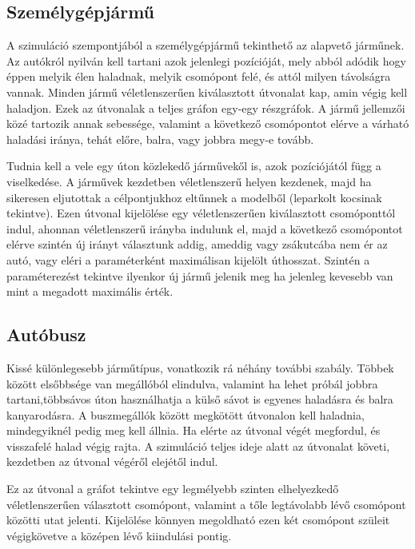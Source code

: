 \subsection{Személygépjármű}

A szimuláció szempontjából a személygépjármű tekinthető az alapvető járműnek. Az autókról nyilván kell tartani azok jelenlegi pozícióját, mely abból adódik hogy éppen melyik élen haladnak, melyik csomópont felé, és attól milyen távolságra vannak. Minden jármű véletlenszerűen kiválasztott útvonalat kap, amin végig kell haladjon. Ezek az útvonalak a teljes gráfon egy-egy részgráfok. A jármű jellemzői közé tartozik annak sebessége, valamint a következő csomópontot elérve a várható haladási iránya, tehát előre, balra, vagy jobbra megy-e tovább. 

Tudnia kell a vele egy úton közlekedő járművekől is, azok pozíciójától függ a viselkedése. A járművek kezdetben véletlenszerű helyen kezdenek, majd ha sikeresen eljutottak a célpontjukhoz 
eltűnnek a modelből (leparkolt kocsinak tekintve). Ezen útvonal kijelölése egy véletlenszerűen kiválasztott csomóponttól indul, ahonnan véletlenszerű irányba indulunk el, majd a következő csomópontot elérve szintén új irányt választunk addig, ameddig vagy zsákutcába nem ér az autó, vagy eléri a paraméterként maximálisan kijelölt úthosszat. Szintén a paraméterezést tekintve ilyenkor új jármű jelenik meg ha jelenleg kevesebb van mint a megadott maximális érték.

\subsection{Autóbusz}

Kissé különlegesebb járműtípus, vonatkozik rá néhány további szabály. Többek között elsőbbsége van megállóból elindulva, valamint ha lehet próbál jobbra tartani,többsávos úton használhatja a külső sávot is egyenes haladásra és balra kanyarodásra. A buszmegállók között megkötött útvonalon kell haladnia, mindegyiknél pedig meg kell állnia. Ha elérte az útvonal végét megfordul, és visszafelé halad végig rajta. A szimuláció teljes ideje alatt az útvonalat követi, kezdetben az útvonal végéről elejétől indul.

Ez az útvonal a gráfot tekintve egy legmélyebb szinten elhelyezkedő véletlenszerűen választott csomópont, valamint a tőle legtávolabb lévő csomópont közötti utat jelenti. Kijelölése könnyen megoldható ezen két csomópont szüleit végigkövetve a középen lévő kiindulási pontig.

